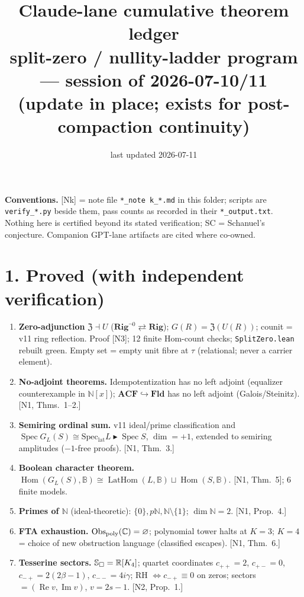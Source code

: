 \documentclass[10pt]{article}
\title{Claude-lane cumulative theorem ledger\\ \large split-zero / nullity-ladder program --- session of 2026-07-10/11\\ (update in place; exists for post-compaction continuity)}
\date{last updated 2026-07-11}
\newcommand{\B}{\mathbb B}\newcommand{\N}{\mathbb N}\newcommand{\Z}{\mathbb Z}
\begin{document}
\maketitle

\noindent\textbf{Conventions.} [Nk] = note file \texttt{*\_note k\_*.md} in this folder; scripts are \texttt{verify\_*.py} beside them, pass counts as recorded in their \texttt{*\_output.txt}. Nothing here is certified beyond its stated verification; SC = Schanuel's conjecture. Companion GPT-lane artifacts are cited where co-owned.

\section*{1. Proved (with independent verification)}
\begin{enumerate}[leftmargin=1.6em,itemsep=1pt]
\item \textbf{Zero-adjunction} $\mathfrak Z\dashv U$ ($\mathbf{Rig}^{\neg0}\rightleftarrows\mathbf{Rig}$); $G(R)=\mathfrak Z(U(R))$; counit = v11 ring reflection. Proof [N3]; 12 finite Hom-count checks; \texttt{SplitZero.lean} rebuilt green. Empty set = empty unit fibre at $\tau$ (relational; never a carrier element).
\item \textbf{No-adjoint theorems.} Idempotentization has no left adjoint (equalizer counterexample in $\N[x]$); $\mathbf{ACF}\hookrightarrow\mathbf{Fld}$ has no left adjoint (Galois/Steinitz). [N1, Thms.\ 1--2.]
\item \textbf{Semiring ordinal sum.} v11 ideal/prime classification and $\operatorname{Spec}G_L(S)\cong\operatorname{Spec_{lat}}L\blacktriangleright\operatorname{Spec}S$, $\dim=+1$, extended to semiring amplitudes ($-1$-free proofs). [N1, Thm.\ 3.]
\item \textbf{Boolean character theorem.} $\operatorname{Hom}(G_L(S),\B)\cong\operatorname{LatHom}(L,\B)\sqcup\operatorname{Hom}(S,\B)$. [N1, Thm.\ 5]; 6 finite models.
\item \textbf{Primes of $\N$} (ideal-theoretic): $\{0\},p\N,\N\setminus\{1\}$; $\dim\N=2$. [N1, Prop.\ 4.]
\item \textbf{FTA exhaustion.} $\operatorname{Obs_{poly}}(\mathbb C)=\varnothing$; polynomial tower halts at $K{=}3$; $K{=}4$ = choice of new obstruction language (classified escapes). [N1, Thm.\ 6.]
\item \textbf{Tesserine sectors.} $\mathbb S_\square=\mathbb R[K_4]$; quartet coordinates $c_{++}=2$, $c_{+-}=0$, $c_{-+}=2(2\beta-1)$, $c_{--}=4i\gamma$; RH $\iff c_{-+}\equiv0$ on zeros; sectors $=(\operatorname{Re}v,\operatorname{Im}v)$, $v=2s-1$. [N2, Prop.\ 1.]

\end{enumerate}
\end{document}
